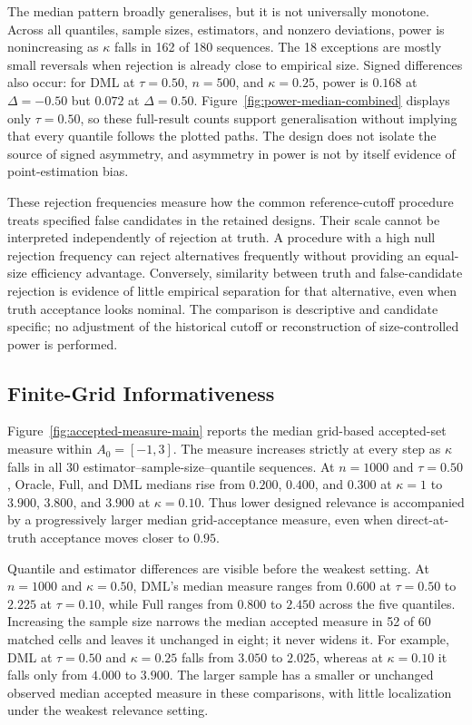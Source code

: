 The median pattern broadly generalises, but it is not universally monotone. Across all quantiles, sample sizes, estimators, and nonzero deviations, power is nonincreasing as $\kappa$ falls in 162 of 180 sequences. The 18 exceptions are mostly small reversals when rejection is already close to empirical size. Signed differences also occur: for DML at $\tau=0.50$, $n=500$, and $\kappa=0.25$, power is $0.168$ at $\Delta=-0.50$ but $0.072$ at $\Delta=0.50$. Figure~\ref{fig:power-median-combined} displays only $\tau=0.50$, so these full-result counts support generalisation without implying that every quantile follows the plotted paths. The design does not isolate the source of signed asymmetry, and asymmetry in power is not by itself evidence of point-estimation bias.

\FloatBarrier

These rejection frequencies measure how the common reference-cutoff procedure treats specified false candidates in the retained designs. Their scale cannot be interpreted independently of rejection at truth. A procedure with a high null rejection frequency can reject alternatives frequently without providing an equal-size efficiency advantage. Conversely, similarity between truth and false-candidate rejection is evidence of little empirical separation for that alternative, even when truth acceptance looks nominal. The comparison is descriptive and candidate specific; no adjustment of the historical cutoff or reconstruction of size-controlled power is performed.

\subsection{Finite-Grid Informativeness}
\label{sec:results-informativeness}

Figure~\ref{fig:accepted-measure-main} reports the median grid-based accepted-set measure within $A_0=[-1,3]$. The measure increases strictly at every step as $\kappa$ falls in all 30 estimator--sample-size--quantile sequences. At $n=1000$ and $\tau=0.50$, Oracle, Full, and DML medians rise from $0.200$, $0.400$, and $0.300$ at $\kappa=1$ to $3.900$, $3.800$, and $3.900$ at $\kappa=0.10$. Thus lower designed relevance is accompanied by a progressively larger median grid-acceptance measure, even when direct-at-truth acceptance moves closer to $0.95$.



Quantile and estimator differences are visible before the weakest setting. At $n=1000$ and $\kappa=0.50$, DML's median measure ranges from $0.600$ at $\tau=0.50$ to $2.225$ at $\tau=0.10$, while Full ranges from $0.800$ to $2.450$ across the five quantiles. Increasing the sample size narrows the median accepted measure in 52 of 60 matched cells and leaves it unchanged in eight; it never widens it. For example, DML at $\tau=0.50$ and $\kappa=0.25$ falls from $3.050$ to $2.025$, whereas at $\kappa=0.10$ it falls only from $4.000$ to $3.900$. The larger sample has a smaller or unchanged observed median accepted measure in these comparisons, with little localization under the weakest relevance setting.

